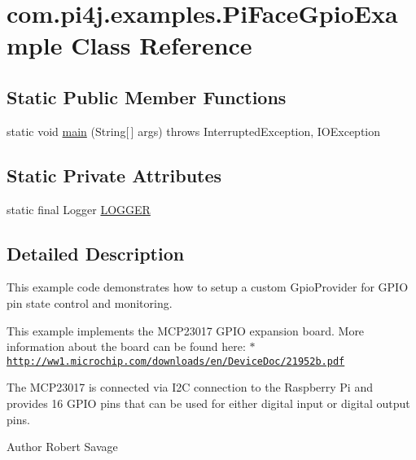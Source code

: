 \hypertarget{classcom_1_1pi4j_1_1examples_1_1PiFaceGpioExample}{}\section{com.\+pi4j.\+examples.\+Pi\+Face\+Gpio\+Example Class Reference}
\label{classcom_1_1pi4j_1_1examples_1_1PiFaceGpioExample}
\subsection*{Static Public Member Functions}
\begin{DoxyCompactItemize}
\item 
static void \hyperlink{classcom_1_1pi4j_1_1examples_1_1PiFaceGpioExample_a33ff816ec82513ddf343e50c7ff6b7ec}{main} (String\mbox{[}$\,$\mbox{]} args)  throws Interrupted\+Exception,             I\+O\+Exception 
\end{DoxyCompactItemize}
\subsection*{Static Private Attributes}
\begin{DoxyCompactItemize}
\item 
static final Logger \hyperlink{classcom_1_1pi4j_1_1examples_1_1PiFaceGpioExample_ac62e802808c916e2d922eef31da256b4}{L\+O\+G\+G\+E\+R}
\end{DoxyCompactItemize}


\subsection{Detailed Description}
This example code demonstrates how to setup a custom Gpio\+Provider for G\+P\+I\+O pin state control and monitoring. 

This example implements the M\+C\+P23017 G\+P\+I\+O expansion board. More information about the board can be found here\+: $\ast$ \href{http://ww1.microchip.com/downloads/en/DeviceDoc/21952b.pdf}{\tt http\+://ww1.\+microchip.\+com/downloads/en/\+Device\+Doc/21952b.\+pdf} 

The M\+C\+P23017 is connected via I2\+C connection to the Raspberry Pi and provides 16 G\+P\+I\+O pins that can be used for either digital input or digital output pins. 

\begin{DoxyAuthor}{Author}
Robert Savage 
\end{DoxyAuthor}


